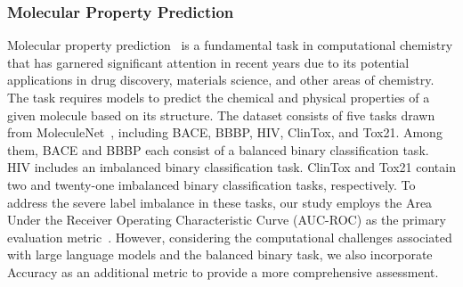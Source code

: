 \subsubsection{Molecular Property Prediction}
Molecular property prediction~\cite{Guo_2021,wang2021chemicalreactionawaremoleculerepresentationlearning} is a fundamental task in computational chemistry that has garnered significant attention in recent years due to its potential applications in drug discovery, materials science, and other areas of chemistry. 
The task requires models to predict the chemical and physical properties of a given molecule based on its structure. The dataset consists of five tasks drawn from MoleculeNet~\cite{wu2018moleculenetbenchmarkmolecularmachine}, including BACE, BBBP, HIV, ClinTox, and Tox21. Among them, BACE and BBBP each consist of a balanced binary classification task. HIV includes an imbalanced binary classification task. ClinTox and Tox21 contain two and twenty-one imbalanced binary classification tasks, respectively. To address the severe label imbalance in these tasks, our study employs the Area Under the Receiver Operating Characteristic Curve (AUC-ROC) as the primary evaluation metric~\cite{tafvizi2022attributingaucrocanalyzebinary}. However, considering the computational challenges associated with large language models and the balanced binary task, we also incorporate Accuracy as an additional metric to provide a more comprehensive assessment.




